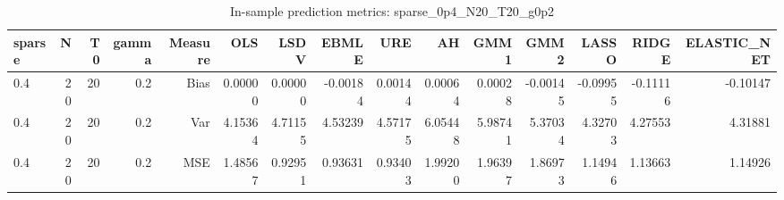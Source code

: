 \begin{table}[!htbp]\centering
\caption{In-sample prediction metrics: sparse_0p4_N20_T20_g0p2}
\label{tab:table2_sparse_0p4_N20_T20_g0p2}
\begin{tabular}{lrrrrrrrrrrrrrr}
\hline
sparse & N & T0 & gamma & Measure & OLS & LSDV & EBMLE & URE & AH & GMM1 & GMM2 & LASSO & RIDGE & ELASTIC_NET \\
\hline
0.4 & 20 & 20 & 0.2 & Bias & 0.00000 & 0.00000 & -0.00184 & 0.00144 & 0.00064 & 0.00028 & -0.00145 & -0.09955 & -0.11116 & -0.10147 \\
0.4 & 20 & 20 & 0.2 & Var & 4.15364 & 4.71155 & 4.53239 & 4.57175 & 6.05448 & 5.98741 & 5.37034 & 4.32703 & 4.27553 & 4.31881 \\
0.4 & 20 & 20 & 0.2 & MSE & 1.48567 & 0.92951 & 0.93631 & 0.93403 & 1.99200 & 1.96397 & 1.86973 & 1.14946 & 1.13663 & 1.14926 \\
\hline
\end{tabular}
\end{table}

